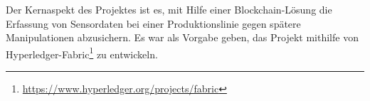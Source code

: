 Der Kernaspekt des Projektes ist es, mit Hilfe einer Blockchain-Lösung die Erfassung von Sensordaten bei einer Produktionslinie gegen spätere Manipulationen abzusichern. 
Es war als Vorgabe geben, das Projekt mithilfe von Hyperledger-Fabric\footnote{\url{https://www.hyperledger.org/projects/fabric}} zu entwickeln.

